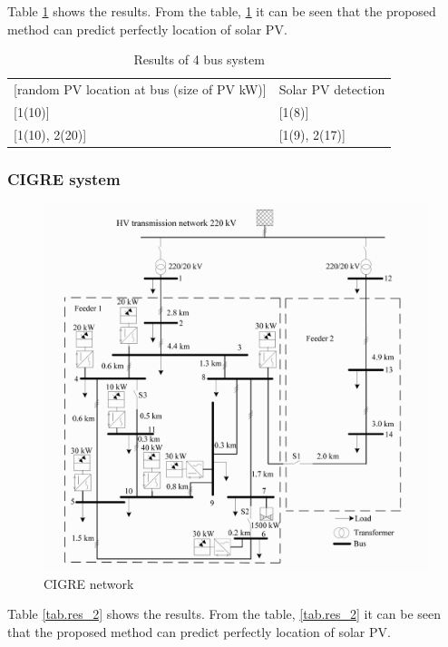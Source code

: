 Table \ref{tab.res_1} shows the results. From the table, \ref{tab.res_1} it can be seen that the proposed method can predict perfectly location of solar PV.

\begin{table}[h]
  \caption{Results of 4 bus system}
  \begin{tabular}{ll}
  {[}random PV location at bus (size of PV kW){]} & Solar PV detection \\
  {[}1(10){]}                                     & {[}1(8){]}         \\
  {[}1(10), 2(20){]}                              & {[}1(9), 2(17){]}
  \end{tabular}
\label{tab.res_1}
\end{table}

\subsubsection{CIGRE system}

\begin{figure}[h!]
  \center
  \includegraphics[scale=0.25]{images/CIGRE_network.png}
  \caption{CIGRE network}
  \label{fig.CIGRE_network}
\end{figure}


Table \ref{tab.res_2} shows the results. From the table, \ref{tab.res_2} it can be seen that the proposed method can predict perfectly location of solar PV.

